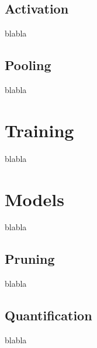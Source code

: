 \subsection{Activation} \label{subs:acti}
blabla
\subsection{Pooling}
blabla
\section{Training}
blabla
\section{Models}
blabla
\subsection{Pruning}
blabla
\subsection{Quantification}
blabla
